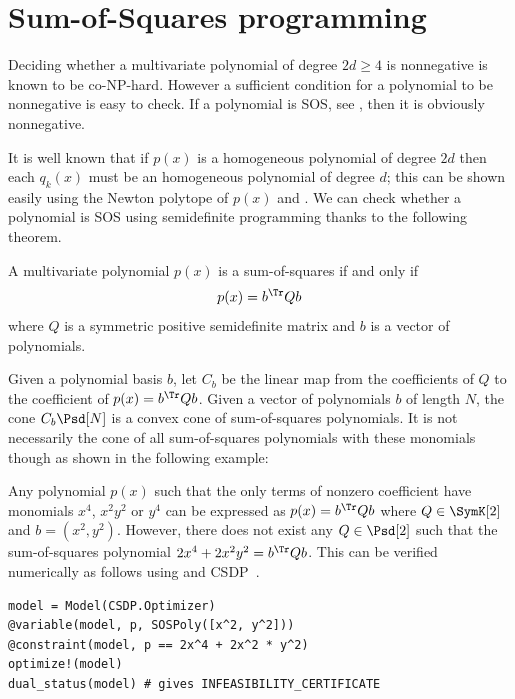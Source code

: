 \documentclass[11pt,twoside,a4paper,openright]{uclouvain-thesis}
\begin{document}
\section{Sum-of-Squares programming}
\label{sec:sosprog}

Deciding whether a multivariate polynomial of degree $2d \geq 4$ is nonnegative is known to be co-NP-hard.
However a sufficient condition for a polynomial to be nonnegative is easy to check.
If a polynomial is SOS, see , then it is obviously nonnegative.

It is well known that if $p(x)$ is a homogeneous polynomial of degree
$2d$ then each $q_k(x)$ must be an homogeneous polynomial of degree $d$;
this can be shown easily using the Newton polytope of $p(x)$ and
\cite[Theorem~1]{reznick1978extremal}.
We can check
whether a polynomial is SOS using semidefinite programming thanks to
the following theorem.
\begin{mytheo}
  \label{theo:sos}
  A multivariate polynomial $p(x)$ is a sum-of-squares if and only if
  \[ p(x) = b^\Tr Q b \]
  where $Q$ is a symmetric positive semidefinite matrix and $b$ is a vector of polynomials.
\end{mytheo}

Given a polynomial basis $b$, let $C_b$ be the linear map from the coefficients of $Q$ to the coefficient of $p(x) = b^\Tr Q b$.
Given a vector of polynomials $b$ of length $N$, the cone $C_b \Psd[N]$ is a convex
cone of sum-of-squares polynomials.
It is not necessarily the cone of all sum-of-squares polynomials with these monomials though as shown in the following example:

\begin{myexem}
  \label{exem:newton}
  Any polynomial $p(x)$ such that the only terms of nonzero coefficient have monomials $x^4$, $x^2y^2$ or $y^4$
  can be expressed as $p(x) = b^\Tr Q b$ where $Q \in \SymK[2]$ and $b = (x^2, y^2)$.
  However, there does not exist any $Q \in \Psd[2]$ such that the sum-of-squares
  polynomial $2x^4 + 2x^2 y^2 = b^\Tr Q b$.
  This can be verified numerically as follows using  and CSDP~\cite{borchers1999csdp}.
\begin{verbatim}
model = Model(CSDP.Optimizer)
@variable(model, p, SOSPoly([x^2, y^2]))
@constraint(model, p == 2x^4 + 2x^2 * y^2)
optimize!(model)
dual_status(model) # gives INFEASIBILITY_CERTIFICATE
\end{verbatim}
\end{myexem}
\end{document}
